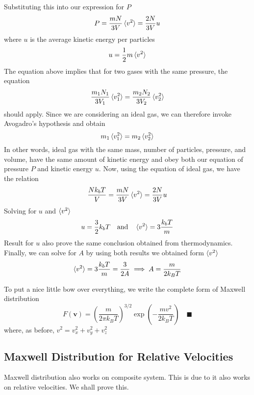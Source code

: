 \documentclass[../../../Main.tex]{subfiles}
\begin{document}
Substituting this into our expression for $P$
\begin{equation*}
    P=\frac{mN}{3V}\braket{v^2}=\frac{2N}{3V}u
\end{equation*}
where $u$ is the average kinetic energy per particles
\begin{equation*}
    u=\frac{1}{2}m\braket{v^2}
\end{equation*}
The equation above implies that for two gases with the same pressure, the equation
\begin{equation*}
    \frac{m_1N_1}{3V_1}\braket{v_1^2}=\frac{m_2 N_2}{3V_2}\braket{v_2^2}
\end{equation*}
should apply. Since we are considering an ideal gas, we can therefore invoke Avogadro's hypothesis and obtain
\begin{equation*}
    m_1\braket{v_1^2}=m_2\braket{v_2^2}
\end{equation*}
In other words, ideal gas with the same mass, number of particles, pressure, and volume, have the same amount of kinetic energy and obey both our equation of pressure $P$ and kinetic energy $u$. Now, using the equation of ideal gas, we have the relation
\begin{equation*}
    \frac{Nk_bT}{V}=\frac{mN}{3V}\braket{v^2}=\frac{2N}{3V}u
\end{equation*}
Solving for $u$ and $\braket{v^2}$
\begin{equation*}
    u=\frac{3}{2}k_bT\quad \text{and} \quad\braket{v^2}=3 \frac{k_bT}{m}
\end{equation*}
Result for $u$ also prove the same conclusion obtained from thermodynamics. Finally, we can solve for $A$ by using both results we obtained form $\braket{v^2}$
\begin{equation*}
    \braket{v^2}=3 \frac{k_bT}{m}=\frac{3}{2A} \implies A=\frac{m}{2k_BT}
\end{equation*}

To put a nice little bow over everything, we write the complete form of Maxwell distribution
\begin{equation*}
    F(\mathbf{v})=\left(\frac{m}{2\pi k_B T}\right)^{3/2}\exp\left(-\frac{mv^2}{2k_B T}\right) \quad\blacksquare
\end{equation*}
where, as before, $v^2=v_x^2+v_y^2+v_z^2$

\subsection*{Maxwell Distribution for Relative Velocities}
Maxwell distribution also works on composite system. This is due to it also works on relative velocities. We shall prove this.
\end{document}
